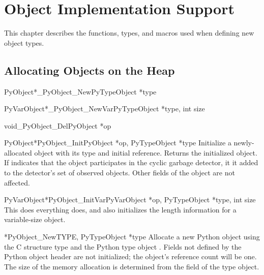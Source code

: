 \chapter{Object Implementation Support \label{newTypes}}


This chapter describes the functions, types, and macros used when
defining new object types.


\section{Allocating Objects on the Heap
         \label{allocating-objects}}

\begin{cfuncdesc}{PyObject*}{_PyObject_New}{PyTypeObject *type}
\end{cfuncdesc}

\begin{cfuncdesc}{PyVarObject*}{_PyObject_NewVar}{PyTypeObject *type, int size}
\end{cfuncdesc}

\begin{cfuncdesc}{void}{_PyObject_Del}{PyObject *op}
\end{cfuncdesc}

\begin{cfuncdesc}{PyObject*}{PyObject_Init}{PyObject *op,
					    PyTypeObject *type}
  Initialize a newly-allocated object  with its type and
  initial reference.  Returns the initialized object.  If 
  indicates that the object participates in the cyclic garbage
  detector, it it added to the detector's set of observed objects.
  Other fields of the object are not affected.
\end{cfuncdesc}

\begin{cfuncdesc}{PyVarObject*}{PyObject_InitVar}{PyVarObject *op,
						  PyTypeObject *type, int size}
  This does everything  does, and also
  initializes the length information for a variable-size object.
\end{cfuncdesc}

\begin{cfuncdesc}{*}{PyObject_New}{TYPE, PyTypeObject *type}
  Allocate a new Python object using the C structure type 
  and the Python type object .  Fields not defined by the
  Python object header are not initialized; the object's reference
  count will be one.  The size of the memory
  allocation is determined from the  field of the
  type object.
\end{cfuncdesc}

